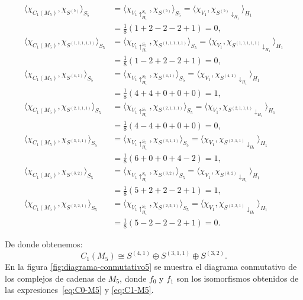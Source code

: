 \documentclass[12pt]{book}
\theoremstyle{definition}
\newcounter{in}
\begin{document}
  \begin{align*}
    \langle\chi_{C_{1}(M_{5})},\chi_{S^{(5)}}\rangle_{S_{5}}&=\langle\chi_{V_{1}\uparrow^{S_{5}}_{H_1}},\chi_{S^{(5)}}\rangle_{S_{5}}=\langle\chi_{V_{1}},\chi_{S^{(5)}\downarrow_{H_{1}}}\rangle_{H_{1}}\\
    &=\frac{1}{8}(1+2-2-2+1)=0,\\
    \langle\chi_{C_{1}(M_{5})},\chi_{S^{(1,1,1,1,1)}}\rangle_{S_{5}}&=\langle\chi_{V_{1}\uparrow^{S_{5}}_{H_1}},\chi_{S^{(1,1,1,1,1)}}\rangle_{S_{5}}=\langle\chi_{V_{1}},\chi_{S^{(1,1,1,1,1)}\downarrow_{H_{1}}}\rangle_{H_{1}}\\
    &=\frac{1}{8}(1-2+2-2+1)=0, \\
    \langle\chi_{C_{1}(M_{5})},\chi_{S^{(4,1)}}\rangle_{S_{5}}&=\langle\chi_{V_{1}\uparrow^{S_{5}}_{H_1}},\chi_{S^{(4,1)}}\rangle_{S_{5}}=\langle\chi_{V_{1}},\chi_{S^{(4,1)}\downarrow_{H_{1}}}\rangle_{H_{1}}\\
    &=\frac{1}{8}(4+4+0+0+0)=1, \\
    \langle\chi_{C_{1}(M_{5})},\chi_{S^{(2,1,1,1)}}\rangle_{S_{5}}&=\langle\chi_{V_{1}\uparrow^{S_{5}}_{H_1}},\chi_{S^{(2,1,1,1)}}\rangle_{S_{5}}=\langle\chi_{V_{1}},\chi_{S^{(2,1,1,1)}\downarrow_{H_{1}}}\rangle_{H_{1}}\\
    &=\frac{1}{8}(4-4+0+0+0)=0, \\
    \langle\chi_{C_{1}(M_{5})},\chi_{S^{(3,1,1)}}\rangle_{S_{5}}&=\langle\chi_{V_{1}\uparrow^{S_{5}}_{H_1}},\chi_{S^{(3,1,1)}}\rangle_{S_{5}}=\langle\chi_{V_{1}},\chi_{S^{(3,1,1)}\downarrow_{H_{1}}}\rangle_{H_{1}}\\
    &=\frac{1}{8}(6+0+0+4-2)=1, \\
    \langle\chi_{C_{1}(M_{5})},\chi_{S^{(3,2)}}\rangle_{S_{5}}&=\langle\chi_{V_{1}\uparrow^{S_{5}}_{H_1}},\chi_{S^{(3,2)}}\rangle_{S_{5}}=\langle\chi_{V_{1}},\chi_{S^{(3,2)}\downarrow_{H_{1}}}\rangle_{H_{1}}\\
    &=\frac{1}{8}(5+2+2-2+1)=1, \\
    \langle\chi_{C_{1}(M_{5})},\chi_{S^{(2,2,1)}}\rangle_{S_{5}}&=\langle\chi_{V_{1}\uparrow^{S_{5}}_{H_1}},\chi_{S^{(2,2,1)}}\rangle_{S_{5}}=\langle\chi_{V_{1}},\chi_{S^{(2,2,1)}\downarrow_{H_{1}}}\rangle_{H_{1}}\\
    &=\frac{1}{8}(5-2-2-2+1)=0.
  \end{align*}

De donde obtenemos:
\begin{equation}
  \label{eq:C1-M5}
  C_{1}(M_{5})\cong S^{(4,1)}\oplus S^{(3,1,1)}\oplus S^{(3,2)}.
\end{equation}
En la figura \ref{fig:diagrama-conmutativo5} se muestra el diagrama
conmutativo de los complejos de cadenas de $M_{5}$, donde $f_{0}$ y
$f_{1}$ son los isomorfismos obtenidos de las expresiones~\ref{eq:C0-M5} y \ref{eq:C1-M5}.
\end{document}
